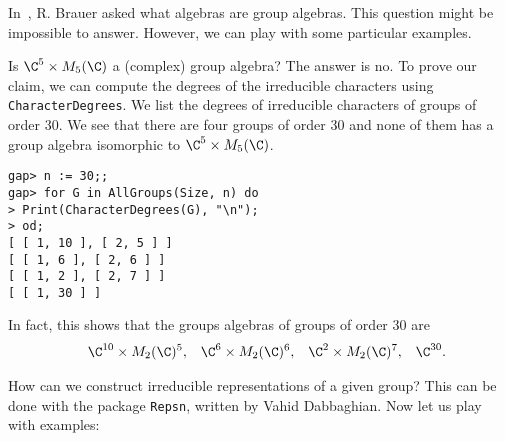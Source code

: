 In~\cite[Problem 1]{MR0178056}, R. Brauer asked what algebras are group
algebras.  This question might be impossible to answer. However, we can play
with some particular examples.

\begin{example}
	Is $\C^5\times M_5(\C)$ a (complex) group algebra? The answer is no.  
	To prove our claim, we can compute the degrees of the irreducible
	characters using \lstinline{CharacterDegrees}. 
We list the degrees
of irreducible characters of groups of order $30$. We see that there are four
groups of order $30$ and none of them has a group algebra isomorphic to
$\C^5\times M_5(\C)$.
\begin{lstlisting}
gap> n := 30;;
gap> for G in AllGroups(Size, n) do
> Print(CharacterDegrees(G), "\n");
> od;
[ [ 1, 10 ], [ 2, 5 ] ]
[ [ 1, 6 ], [ 2, 6 ] ]
[ [ 1, 2 ], [ 2, 7 ] ]
[ [ 1, 30 ] ]
\end{lstlisting}
In fact, this shows that the groups algebras of groups of order $30$
are 
\begin{align*}
  &&\C^{10}\times M_2(\C)^5,
  &&\C^{6}\times M_2(\C)^6,
  &&\C^{2}\times M_2(\C)^7,
  &&\C^{30}.
\end{align*}
\end{example}

How can we construct irreducible representations of a given group? This can be
done with the package \lstinline{Repsn}, written by Vahid Dabbaghian. 
Now let us play with examples:

